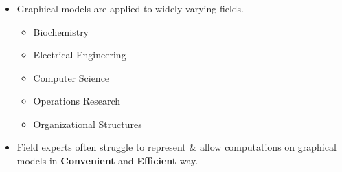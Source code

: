 \documentclass[mathserif,10pt]{beamer}
\newcommand{\cmt}[1]{}
\begin{document}
{
  \frametitle{\secname}
  \begin{itemize}[<+->]
    \item Graphical models are applied to widely varying fields.
    \begin{itemize}
      \item Biochemistry 
        \cmt{genomics}
      \item Electrical Engineering
        \cmt{communication networks }
      \item Computer Science
        \cmt{Algorithms and computation}
      \item Operations Research
        \cmt{Scheduling}
      \item Organizational Structures 
        \cmt{social networking}
    \end{itemize} 
    \vspace{1cm}
    \item Field experts often struggle to represent \& allow computations on  graphical models in \textbf{Convenient} and \textbf{Efficient} way.
      \cmt{
Convenience: is essential so that even for domain experts who are not coding experts
can code and reason about their implementation. Ease of interface could be due to:
– Expressive power of the language representing those models.
– Intuitive extensibility of the language.
– Ability of the language to provide exploratory programming, where the user may
experiment with different ideas (without dwelling much into the language syntax)
before coming to a conclusive one.

Designed language need to be efficient in the following sense.
– Underlying design decisions including data structures need to be carefully crafted to
achieve expected run-time w.r.t the input size.
– Implementation need to be scalable w.r.t the space/time requirements. This is im-
portant because most of the graph algorithm typically work on huge input sizes.

To meet all above goals and most importantly exploratory programming, we decided to work
on a dynamically typed language to represent graphs and apply various computations on them.
With a dynamically typed language the user do not have to worry much about declaring types
and can focus mostly on his/her experiments.
      }
    \vspace{1cm}
  \end{itemize} 
}
\end{document}
